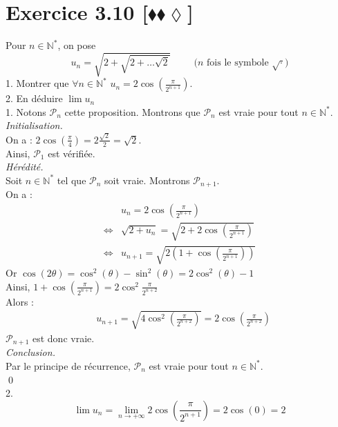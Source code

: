 \documentclass[10pt]{article}
\begin{document}
\section*{Exercice 3.10 [$\blacklozenge\blacklozenge\lozenge$]}
\begin{tcolorbox}[enhanced, width=6in, center, size=fbox, fontupper=\large, drop shadow southwest]
    Pour $n\in\mathbb{N}^*$, on pose
    \begin{equation*}
        u_n=\sqrt{2+\sqrt{2+\dots\sqrt{2}}}\hspace{1cm}\text{($n$ fois le symbole $\sqrt{\cdot}$)}
    \end{equation*}
    1. Montrer que $\forall{n\in\mathbb{N}^*}$ $u_n=2\cos(\frac{\pi}{2^{n+1}})$.\\
    2. En déduire $\lim{u_n}$\\[0.25cm]
    1. Notons $\mathcal{P}_n$ cette proposition. Montrons que $\mathcal{P}_n$ est vraie pour tout $n\in\mathbb{N}^*$.\\
    \emph{Initialisation.}\\
    On a : $2\cos(\frac{\pi}{4})=2\frac{\sqrt{2}}{2}=\sqrt{2}$.\\
    Ainsi, $\mathcal{P}_1$ est vérifiée.\\
    \emph{Hérédité.}\\
    Soit $n\in\mathbb{N}^*$ tel que $\mathcal{P}_n$ soit vraie. Montrons $\mathcal{P}_{n+1}$.\\
    On a :
    \begin{align*}
        &u_n=2\cos\left(\frac{\pi}{2^{n+1}}\right)\\
        \iff&\sqrt{2+u_n}=\sqrt{2+2\cos\left(\frac{\pi}{2^{n+1}}\right)}\\
        \iff&u_{n+1}=\sqrt{2(1+\cos(\frac{\pi}{2^{n+1}}))}
    \end{align*}
    Or $\cos(2\theta)=\cos^2(\theta)-\sin^2(\theta)=2\cos^2(\theta)-1$\\
    Ainsi, $1+\cos(\frac{\pi}{2^{n+1}})=2\cos^2{\frac{\pi}{2^{n+2}}}$\\
    Alors :
    \begin{align*}
        &u_{n+1}=\sqrt{4\cos^2(\frac{\pi}{2^{n+2}})}=2\cos(\frac{\pi}{2^{n+2}})
    \end{align*}
    $\mathcal{P}_{n+1}$ est donc vraie.\\
    \emph{Conclusion.}\\
    Par le principe de récurrence, $\mathcal{P}_n$ est vraie pour tout $n\in\mathbb{N}^*$.\\[0.25cm]
    \qed\\
    2.
    \begin{equation*}
        \lim{u_n}=\lim_{n\rightarrow+\infty}{2\cos(\frac{\pi}{2^{n+1}})}=2\cos(0)=2
    \end{equation*}
\end{tcolorbox}
\end{document}
